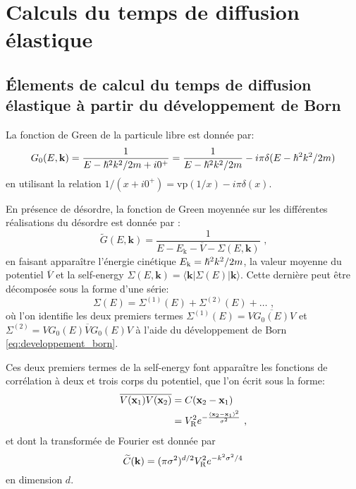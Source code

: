 \chapter{Calculs du temps de diffusion élastique}
\label{ch:anex_taus}

\section{Élements de calcul du temps de diffusion élastique à partir du développement de Born}
La fonction de Green de la particule libre est donnée par:
\begin{equation}
G_0(E,\mathbf{k})=\frac{1}{E-\hslash^2k^2/2m+i0^+}=\frac{1}{E-\hslash^2k^2/2m}-i \pi \delta(E-\hslash^2k^2/2m)
\end{equation}
en utilisant la relation $ 1/(x+i0^+)=\mathrm{vp}(1/x)-i\pi \delta(x)$.

En présence de désordre, la fonction de Green moyennée sur les différentes réalisations du désordre est donnée par :
\begin{equation}
\widetilde{G}(E,\mathbf{k})=\frac{1}{E-E_{\mathrm{k}}-\overline{V}-\Sigma(E,\mathbf{k})} \text{ ,}
\end{equation}
en faisant apparaître l'énergie cinétique $E_{\mathrm{k}}=\hslash^2k^2/2m$, la valeur moyenne du potentiel $\overline{V}$ et la self-energy $\Sigma(E,\mathbf{k})=\langle\mathbf{k}|\Sigma(E)|\mathbf{k}\rangle$. Cette dernière peut être décomposée sous la forme d'une série:
\begin{equation}
\Sigma(E)=\Sigma^{(1)}(E) + \Sigma^{(2)}(E) + \dots \text{ ,}
\end{equation}
où l'on identifie les deux premiers termes $\Sigma^{(1)}(E)=\overline{V G_0(E) V}$ et $\Sigma^{(2)}=\overline{V G_0(E) V G_0(E) V}$ à l'aide du développement de Born \ref{eq:developpement_born}.

Ces deux premiers termes de la self-energy font apparaître les fonctions de corrélation à deux et trois corps du potentiel, que l'on écrit sous la forme:
\begin{align}
\overline{V(\mathbf{x}_{\mathrm{1}})V(\mathbf{x}_{\mathrm{2}})}&=C(\mathbf{x}_{\mathrm{2}}-\mathbf{x}_{\mathrm{1}}) \\
&=V_{\mathrm{R}}^2 e^{-\frac{(\mathbf{x}_{\mathrm{2}}-\mathbf{x}_{\mathrm{1}})^2}{\sigma^2}} \text{ ,}
\end{align}
et dont la transformée de Fourier est donnée par
\begin{equation}
\widetilde{C}(\mathbf{k})=(\pi\sigma^2)^{d/2}V_{\mathrm{R}}^2 e^{-k^2\sigma^2/4}
\end{equation}
en dimension $d$.

